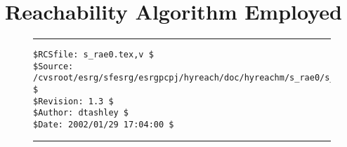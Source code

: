 %
\section{Reachability Algorithm Employed}
\label{srae0}


\noindent\begin{figure}[!b]
\noindent\rule[-0.25in]{\textwidth}{1pt}
\begin{tiny}
\begin{verbatim}
$RCSfile: s_rae0.tex,v $
$Source: /cvsroot/esrg/sfesrg/esrgpcpj/hyreach/doc/hyreachm/s_rae0/s_rae0.tex,v $
$Revision: 1.3 $
$Author: dtashley $
$Date: 2002/01/29 17:04:00 $
\end{verbatim}
\end{tiny}
\noindent\rule[0.25in]{\textwidth}{1pt}
\end{figure}
%
%
%
